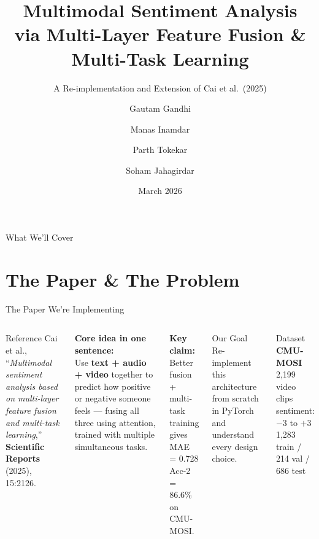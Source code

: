 \documentclass[aspectratio=169]{beamer}
\title[Multimodal Sentiment Analysis]{Multimodal Sentiment Analysis\\via Multi-Layer Feature Fusion \& Multi-Task Learning}
\subtitle{A Re-implementation and Extension of Cai et al.\ (2025)}
\author[TokeNization]{Gautam Gandhi \and Manas Inamdar \and Parth Tokekar \and Soham Jahagirdar}
\institute[IIIT Hyderabad]{Introduction to NLP (S26) --- IIIT Hyderabad\\[4pt] \textbf{Team: TokeNization}}
\date{March 2026}
\begin{document}
\begin{frame}[plain]
  \titlepage
\end{frame}

\begin{frame}{What We'll Cover}
  \tableofcontents[hideallsubsections]
\end{frame}

\section{The Paper \& The Problem}

\begin{frame}{The Paper We're Implementing}
  \begin{columns}[T]
      \begin{block}{Reference}
        Cai et al., ``\textit{Multimodal sentiment analysis based on multi-layer feature
        fusion and multi-task learning},''\\
        \textbf{Scientific Reports} (2025), 15:2126.
      \end{block}

      \vspace{6pt}
      \textbf{Core idea in one sentence:}\\[4pt]
      Use \textbf{text + audio + video} together to predict how positive or negative
      someone feels — fusing all three using attention, trained with multiple
      simultaneous tasks.

      \vspace{8pt}
      \textbf{Key claim:} Better fusion + multi-task training gives\\
      \quad MAE = 0.728 \quad Acc-2 = 86.6\% \quad on CMU-MOSI.

      \begin{alertblock}{Our Goal}
        \small
        Re-implement this architecture from scratch in PyTorch and understand
        every design choice.
      \end{alertblock}
      \vspace{6pt}
      \begin{exampleblock}{Dataset}
        \small
        \textbf{CMU-MOSI}\\
        2,199 video clips\\
        sentiment: $-3$ to $+3$\\
        1,283 train / 214 val / 686 test
      \end{exampleblock}
  \end{columns}
\end{frame}
\end{document}
